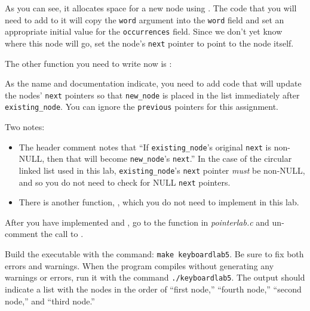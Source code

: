 

As you can see, it allocates space for a new node using .
The code that you will need to add to it will copy the \lstinline{word} argument into the \lstinline{word} field and set an appropriate initial value for the \lstinline{occurrences} field.
Since we don't yet know where this node will go, set the node's \lstinline{next} pointer to point to the node itself.

The other function you need to write now is :



As the name and documentation indicate, you need to add code that will update the nodes' \lstinline{next} pointers so that \lstinline{new_node} is placed in the list immediately after \lstinline{existing_node}.
You can ignore the \lstinline{previous} pointers for this assignment.

Two notes:
\begin{itemize}
    \item The header comment notes that ``If \lstinline{existing_node}'s original \lstinline{next} is non-NULL, then that will become \lstinline{new_node}'s \lstinline{next}.''
            In the case of the circular linked list used in this lab, \lstinline{existing_node}'s \lstinline{next} pointer \textit{must} be non-NULL, and so you do not need to check for NULL \lstinline{next} pointers.
    \item There is another function, , which you do not need to implement in this lab.
\end{itemize}

After you have implemented  and , go to the  function in \textit{pointerlab.c} and un-comment the call to .



Build the executable with the command: \texttt{make keyboardlab5}.
Be sure to fix both errors and warnings.
When the program compiles without generating any warnings or errors, run it with the command \texttt{./keyboardlab5}.
The output should indicate a list with the nodes in the order of ``first node,'' ``fourth node,'' ``second node,'' and ``third node.''

